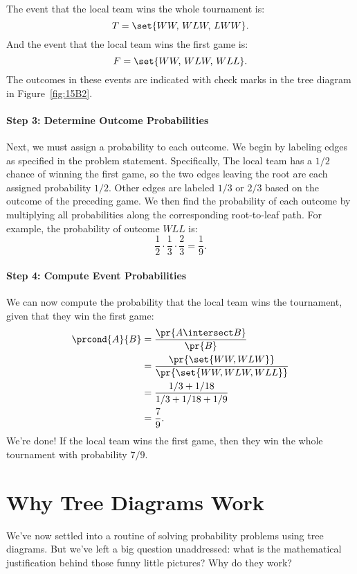 The event that the local team wins the whole tournament is:
%
\[
    T = \set{WW,\, WLW,\, LWW}.
\]
%
And the event that the local team wins the first game is:
%
\[
    F = \set{WW,\, WLW,\, WLL }.
\]
%
The outcomes in these events are indicated with check marks in the tree
diagram in Figure~\ref{fig:15B2}.

\paragraph{Step 3:  Determine Outcome Probabilities}

Next, we must assign a probability to each outcome.  We begin by
labeling edges as specified in the problem statement.  Specifically,
The local team has a $1/2$ chance of winning the first game, so
the two edges leaving the root are each assigned probability $1/2$.
Other edges are labeled $1/3$ or $2/3$ based on the outcome of the
preceding game.  We then find the probability of each outcome by
multiplying all probabilities along the corresponding root-to-leaf
path.  For example, the probability of outcome $WLL$ is:
%
\[
    \frac{1}{2} \cdot \frac{1}{3} \cdot \frac{2}{3} = \frac{1}{9}.
\]

\paragraph{Step 4: Compute Event Probabilities}

We can now compute the probability that the local team wins the
tournament, given that they win the first game:
%
\begingroup
{}
\begin{align*}
\prcond{A}{B}
    & = \frac{\pr{A \intersect B}}{\pr{B}} \\
    & = \frac{\pr{\set{WW, WLW}}}{\pr{\set{WW, WLW, WLL}}} \\
    & = \frac{1/3 + 1/18}{1/3 + 1/18 + 1/9} \\
    & = \frac{7}{9}.
\end{align*}
\endgroup
%
We're done!  If the local team wins the first game, then they win
the whole tournament with probability $7 / 9$.

\section{Why Tree Diagrams Work}\label{product_rule_subsec}

We've now settled into a routine of solving probability problems using
tree diagrams.  But we've left a big question unaddressed: what is the
mathematical justification behind those funny little pictures?  Why do
they work?

